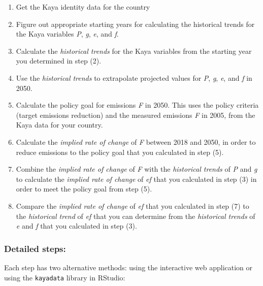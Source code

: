 \documentclass[
]{article}
\providecommand{\tightlist}{%
  \setlength{\itemsep}{0pt}\setlength{\parskip}{0pt}}
\begin{document}
\begin{enumerate}
\def\labelenumi{\arabic{enumi}.}
\tightlist
\item
  Get the Kaya identity data for the country
\item
  Figure out appropriate starting years for calculating the historical
  trends for the Kaya variables \emph{P}, \emph{g}, \emph{e}, and
  \emph{f}.
\item
  Calculate the \emph{historical trends} for the Kaya variables from the
  starting year you determined in step (2).
\item
  Use the \emph{historical trends} to extrapolate projected values for
  \emph{P}, \emph{g}, \emph{e}, and \emph{f} in 2050.
\item
  Calculate the policy goal for emissions \emph{F} in 2050. This uses
  the policy criteria (target emissions reduction) and the measured
  emissions \emph{F} in 2005, from the Kaya data for your country.
\item
  Calculate the \emph{implied rate of change} of \emph{F} between 2018
  and 2050, in order to reduce emissions to the policy goal that you
  calculated in step (5).
\item
  Combine the \emph{implied rate of change} of \emph{F} with the
  \emph{historical trends} of \emph{P} and \emph{g} to calculate the
  \emph{implied rate of change} of \emph{ef} that you calculated in step
  (3) in order to meet the policy goal from step (5).
\item
  Compare the \emph{implied rate of change} of \emph{ef} that you
  calculated in step (7) to the \emph{historical trend} of \emph{ef}
  that you can determine from the \emph{historical trends} of \emph{e}
  and \emph{f} that you calculated in step (3).
\end{enumerate}

\hypertarget{detailed-steps}{%
\subsubsection{Detailed steps:}\label{detailed-steps}}

Each step has two alternative methods: using the interactive web
application or using the \texttt{kayadata} library in RStudio:
\end{document}
